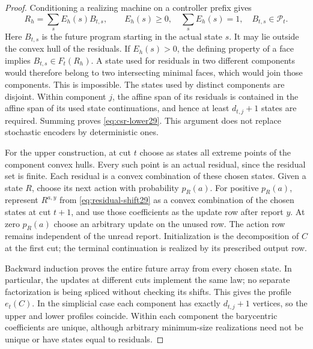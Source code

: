 \begin{proof}
Conditioning a realizing machine on a controller prefix gives
\begin{equation}\label{eq:csr-factor29}
                 R_h=\sum_s E_h(s)B_{t,s},
 \qquad E_h(s)\ge0,\quad\sum_sE_h(s)=1,
 \quad B_{t,s}\in\mathscr P_t.
\end{equation}
Here $B_{t,s}$ is the future program starting in the actual state $s$.
It may lie outside the convex hull of the residuals. If $E_h(s)>0$,
the defining property of a face implies $B_{t,s}\in F_t(R_h)$.
A state used for residuals in two different components would therefore
belong to two intersecting minimal faces, which would join those
components. This is impossible. The states used by distinct components
are disjoint. Within component $j$, the affine span of its residuals
is contained in the affine span of its used state continuations, and
hence at least $d_{t,j}+1$ states are required. Summing proves
\eqref{eq:csr-lower29}. This argument does not replace stochastic
encoders by deterministic ones.

For the upper construction, at cut $t$ choose as states all extreme
points of the component convex hulls. Every such point is an actual
residual, since the residual set is finite. Each residual is a convex
combination of these chosen states. Given a state $R$, choose its next
action with probability $p_R(a)$. For positive $p_R(a)$, represent
$R^{a,y}$ from \eqref{eq:residual-shift29} as a convex combination of
the chosen states at cut $t+1$, and use those coefficients as the update
row after report $y$. At zero $p_R(a)$ choose an arbitrary update on
the unused row. The action row remains independent of the unread
report. Initialization is the decomposition of $C$ at the first cut;
the terminal continuation is realized by its prescribed output row.

Backward induction proves the entire future array from every chosen
state. In particular, the updates at different cuts implement the same
law; no separate factorization is being spliced without checking its
shifts. This gives the profile $e_t(C)$. In the simplicial case each
component has exactly $d_{t,j}+1$ vertices, so the upper and lower
profiles coincide. Within each component the barycentric coefficients
are unique, although arbitrary minimum-size realizations need not be
unique or have states equal to residuals.
\end{proof}

